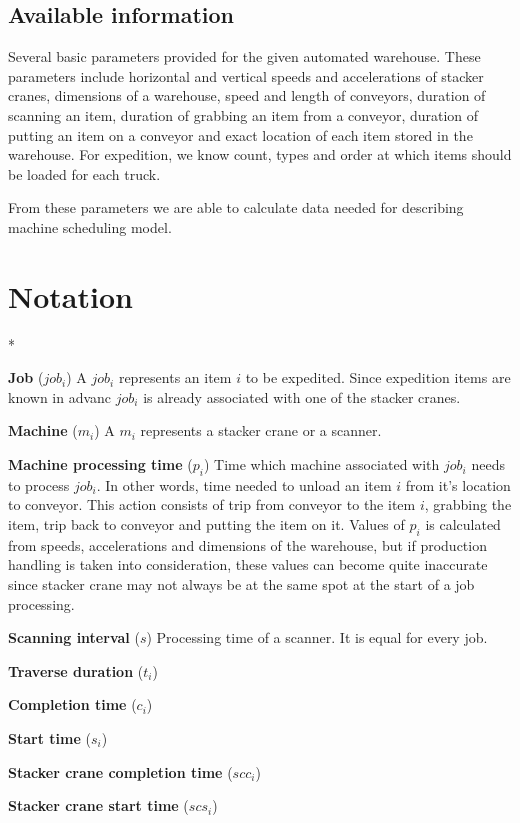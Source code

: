\documentclass{ctuthesis}
\begin{document}
\subsection{Available information}
Several basic parameters provided for the given automated warehouse. These parameters include horizontal and vertical speeds and accelerations of stacker cranes, dimensions of a warehouse, speed and length of conveyors, duration of scanning an item, duration of grabbing an item from a conveyor, duration of putting an item on a conveyor and exact location of each item stored in the warehouse. For expedition, we know count, types and order at which items should be loaded for each truck. 

From these parameters we are able to calculate data needed for describing machine scheduling model.

\section{Notation}*

\noindent \textbf{Job} ($job_i$) A $job_i$ represents an item $i$ to be expedited. Since expedition items are known in advanc $job_i$ is already associated with one of the stacker cranes. 

\noindent \textbf{Machine} ($m_i$) A $m_i$ represents a stacker crane or a scanner. 

\noindent \textbf{Machine processing time} ($p_i$) Time which machine associated with $job_i$ needs to process $job_i$. In other words, time needed to unload an item $i$ from it's location to conveyor. This action consists of trip from conveyor to the item $i$, grabbing the item, trip back to conveyor and putting the item on it. Values of $p_i$ is calculated from speeds, accelerations and dimensions of the warehouse, but if production handling is taken into consideration, these values can become quite inaccurate since stacker crane may not always be at the same spot at the start of a job processing.


\noindent \textbf{Scanning interval} ($s$) Processing time of a scanner. It is equal for every job.

\noindent \textbf{Traverse duration} ($t_i$)

\noindent \textbf{Completion time} ($c_i$)

\noindent \textbf{Start time} ($s_i$)

\noindent \textbf{Stacker crane completion time} ($scc_i$)

\noindent \textbf{Stacker crane start time} ($scs_i$)
\end{document}
